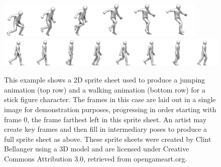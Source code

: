 \begin{figure}[htp]
    \centering
    \includegraphics[width=\textwidth]{images/sprite_example/platformer_sprites_jump.png}
    \includegraphics[width=\textwidth]{images/sprite_example/platformer_sprites_walk.png}
    \caption[Example of a 2D Sprite Animation]{This example shows a 2D sprite sheet used to produce a jumping animation (top row) and a walking animation (bottom row) for a stick figure character.  The frames in this case are laid out in a single image for demonstration purposes, progressing in order starting with frame 0, the frame farthest left in this sprite sheet.  An artist may create key frames and then fill in intermediary poses to produce a full sprite sheet as above.  These sprite sheets were created by Clint Bellanger using a 3D model and are licensed under Creative Commons Attribution 3.0, retrieved from opengameart.org.}
    \label{fig:sprite_sheet}
\end{figure}


